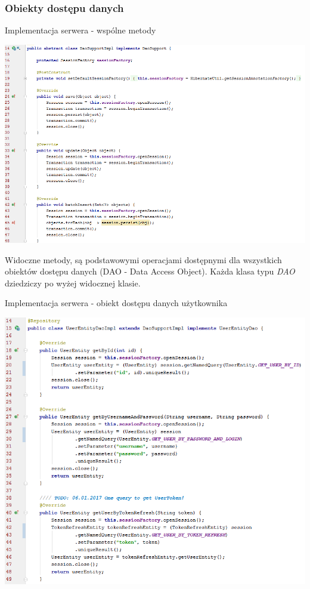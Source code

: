 \documentclass[10pt,titlepage]{article} %
\begin{document}
\subsubsection{Obiekty dostępu danych}\label{Obiekty dostępu danych - DAO}

\begin{listing}[H]
\caption[Implementacja serwera - wspólne metody]{Implementacja serwera - wspólne metody}
\includegraphics[width=1.0\textwidth, height=0.75\textheight]{img/sekcja3/backend/daoSupport}
\end{listing} 
Widoczne metody, są podstawowymi operacjami dostępnymi dla wszystkich obiektów dostępu danych (DAO - Data Access Object). Każda klasa typu \textit{DAO} dziedziczy po wyżej widocznej klasie.

\begin{listing}[H]
\caption[Implementacja serwera - obiekt dostępu danych użytkownika]{Implementacja serwera - obiekt dostępu danych użytkownika}
\includegraphics[width=1.0\textwidth, height=0.85\textheight]{img/sekcja3/backend/daoUzytkownik}
\end{listing} 
\end{document}
